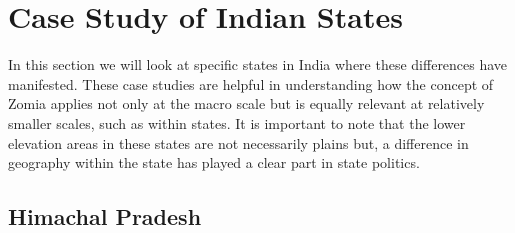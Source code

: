 \section{Case Study of Indian States}
In this section we will look at specific states in India where these differences have manifested. These case studies are helpful in understanding how the concept of Zomia applies not only at the macro scale but is equally relevant at relatively smaller scales, such as within states. It is important to note that the lower elevation areas in these states are not necessarily plains but, a difference in geography within the state has played a clear part in state politics.

\subsection{Himachal Pradesh}
